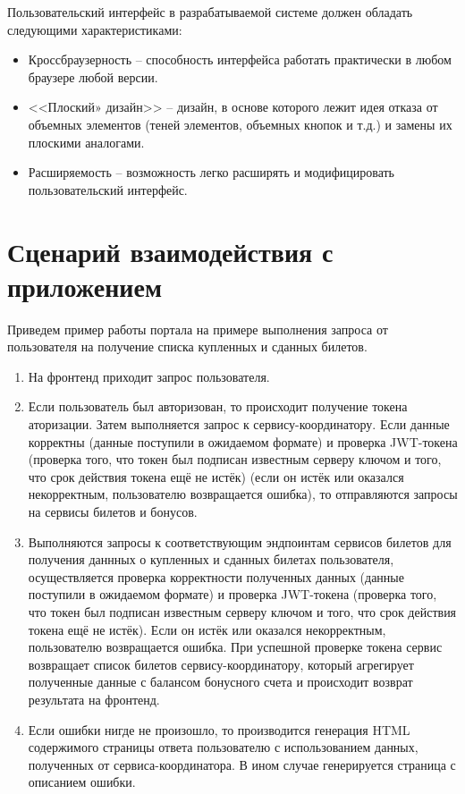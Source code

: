 Пользовательский интерфейс в разрабатываемой системе должен обладать следующими характеристиками:
\begin{itemize}
  \item Кроссбраузерность -- способность интерфейса работать практически в любом браузере любой версии.
  \item <<Плоский» дизайн>> -- дизайн, в основе которого лежит идея отказа от объемных элементов (теней элементов, объемных кнопок и т.д.) и замены их плоскими аналогами.
  \item Расширяемость -- возможность легко расширять и модифицировать пользовательский интерфейс.
\end{itemize}


\section{Сценарий взаимодействия с приложением}
Приведем пример работы портала на примере выполнения запроса от пользователя на получение списка купленных и сданных билетов.

\begin{enumerate}
  \item На фронтенд приходит запрос пользователя.
  \item Если пользователь был авторизован, то происходит получение токена аторизации. Затем выполняется запрос к сервису-координатору. Если данные корректны (данные поступили в ожидаемом формате) и проверка JWT-токена (проверка того, что токен был подписан известным серверу ключом и того, что срок действия токена ещё не истёк) (если он истёк или оказался некорректным, пользователю возвращается ошибка), то отправляются запросы на сервисы билетов и бонусов.
  \item Выполняются запросы к соответствующим эндпоинтам сервисов билетов для получения даннных о купленных и сданных билетах пользователя, осуществляется проверка корректности полученных данных (данные поступили в ожидаемом формате) и проверка JWT-токена (проверка того, что токен был подписан известным серверу ключом и того, что срок действия токена ещё не истёк). Если он истёк или оказался некорректным, пользователю возвращается ошибка. При успешной проверке токена сервис возвращает список билетов сервису-координатору, который агрегирует полученные данные с балансом бонусного счета и происходит возврат результата на фронтенд.
  \item Если ошибки нигде не произошло, то производится генерация HTML содержимого страницы ответа пользователю с использованием данных, полученных от сервиса-координатора. В ином случае генерируется страница с описанием ошибки.
\end{enumerate}